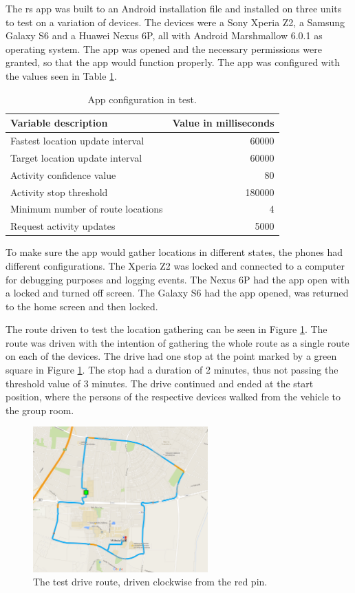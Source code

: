 The \gls{rs} app was built to an Android installation file and installed on three units to test on a variation of devices.
The devices were a Sony Xperia Z2, a Samsung Galaxy S6 and a Huawei Nexus 6P, all with Android Marshmallow 6.0.1 as operating system.
The app was opened and the necessary permissions were granted, so that the app would function properly.
The app was configured with the values seen in Table \ref{tab:appconfig}.

\begin{table}[!ht]
	\centering
	\begin{tabular}{l r}
		Variable description & Value in milliseconds\\
		\hline
		Fastest location update interval & 60000\\
		Target location update interval & 60000\\
		Activity confidence value & 80\\
		Activity stop threshold & 180000\\
		Minimum number of route locations & 4\\
		Request activity updates & 5000\\ 
	\end{tabular}
	\caption{App configuration in test.}
	\label{tab:appconfig}
\end{table}

To make sure the app would gather locations in different states, the phones had different configurations.
The Xperia Z2 was locked and connected to a computer for debugging purposes and logging events.
The Nexus 6P had the app open with a locked and turned off screen. 
The Galaxy S6 had the app opened, was returned to the home screen and then locked.

The route driven to test the location gathering can be seen in Figure \ref{fig:testroute}.
The route was driven with the intention of gathering the whole route as a single route on each of the devices.
The drive had one stop at the point marked by a green square in Figure \ref{fig:testroute}.
The stop had a duration of 2 minutes, thus not passing the threshold value of 3 minutes.
The drive continued and ended at the start position, where the persons of the respective devices walked from the vehicle to the group room.

\begin{figure}[h]
	\centering
	\includegraphics[width=0.6\textwidth]{figures/testroute.png}
	\caption{The test drive route, driven clockwise from the red pin.}
	\label{fig:testroute}
\end{figure}


